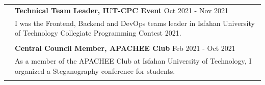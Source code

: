 \documentclass[letterpaper, 11pt]{article}
\begin{document}
\begin{longtable}{p{1.7in}p{5.1in}}
& \textbf{Technical Team Leader, IUT-CPC Event} \hfill Oct 2021 - Nov 2021 \\
& I was the Frontend, Backend and DevOps teams leader in Isfahan University of Technology Collegiate Programming Contest 2021. \\
& \\

& \textbf{Central Council Member, APACHEE Club} \hfill Feb 2021 - Oct 2021 \\
& As a member of the APACHEE Club at Isfahan University of Technology, I organized a Steganography conference for students. \\
& \\


\end{longtable}
\end{document}
